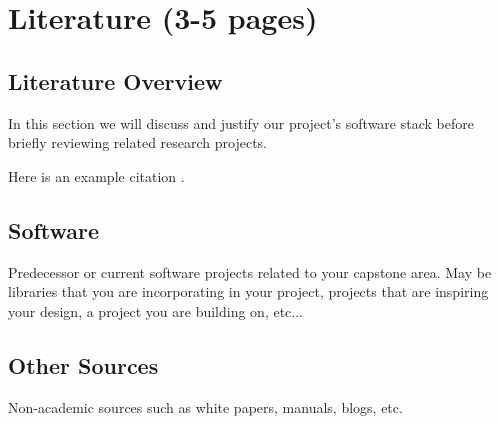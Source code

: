 \chapter{Literature (3-5 pages)}
\label{ch:Literature}



\section{Literature Overview}

In this section we will discuss and justify our project's software stack before briefly reviewing related research projects.

Here is an example citation \cite{Doe2017}.




\section{Software}

Predecessor or current software projects related to your capstone area. May be libraries that you are incorporating in your project, projects that are inspiring your design, a project you are building on, etc...




\section{Other Sources}

Non-academic sources such as white papers, manuals, blogs, etc.

